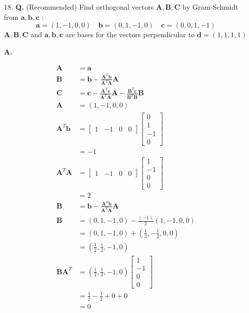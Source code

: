 \documentclass[main.tex]{subfiles}
\begin{document}
\begin{enumerate}
    \item [18.] \textbf{Q.} (Recommended) Find orthogonal vectors $\boldsymbol{A}, \boldsymbol{B}, \boldsymbol{C}$ by Gram-Schmidt from $\boldsymbol{a}, \boldsymbol{b}, \boldsymbol{c}$ :
    $$
    \boldsymbol{a}=(1,-1,0,0) \quad \boldsymbol{b}=(0,1,-1,0) \quad \boldsymbol{c}=(0,0,1,-1)
    $$
    $\boldsymbol{A}, \boldsymbol{B}, \boldsymbol{C}$ and $\boldsymbol{a}, \boldsymbol{b}, \boldsymbol{c}$ are bases for the vectors perpendicular to $\boldsymbol{d}=(1,1,1,1)$ 
    
    \textbf{A.} 
    
    $$
    \begin{aligned}
    \bm{A}&=\bm{a}\\
    \bm{B}&=\bm{b}-\frac{\bm{A}^{T} \bm{b}}{\bm{A}^{T} \bm{A}} \bm{A}\\
    \bm{C}&=\bm{c}-\frac{\bm{A}^{T} \bm{c}}{\bm{A}^{T} \bm{A}} \bm{A}-\frac{\bm{B}^{T} \bm{c}}{\bm{B}^{T} \bm{B}} \bm{B}\\
    \bm{A} &= (1,-1,0,0)\\
    \bm{A}^{T} \bm{b} &=\left[\begin{array}{llll}
    1 & -1 & 0 & 0
    \end{array}\right]\left[\begin{array}{c}
    0 \\
    1 \\
    -1 \\
    0
    \end{array}\right] \\
    &=-1 \\
    \bm{A}^{T} \bm{A} &=\left[\begin{array}{llll}
    1 & -1 & 0 & 0
    \end{array}\right]\left[\begin{array}{c}
    1 \\
    -1 \\
    0 \\
    0
    \end{array}\right] \\
    &=2 \\
    \bm{B} &=\bm{b}-\frac{\bm{A}^{T} \bm{b}}{\bm{A}^{T} \bm{A}} \bm{A} \\
    \bm{B} &=(0,1,-1,0)-\frac{(-1)}{2}(1,-1,0,0) \\
    &=(0,1,-1,0)+\left(\frac{1}{2},-\frac{1}{2}, 0,0\right) \\
    &=\left(\frac{1}{2}, \frac{1}{2},-1,0\right)\\
    \bm{B} \bm{A}^{T} &=\left(\frac{1}{2}, \frac{1}{2},-1,0\right)\left[\begin{array}{c}
    1 \\
    -1 \\
    0 \\
    0
    \end{array}\right] \\
    &=\frac{1}{2}-\frac{1}{2}+0+0 \\
    &=0
    \end{aligned}
    $$
    

\end{enumerate}
\end{document}

